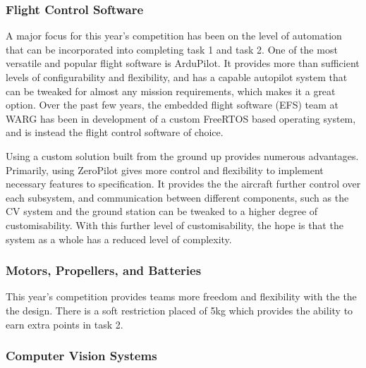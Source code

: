 
\subsubsection{Flight Control Software}

A major focus for this year's competition has been on the level of automation
that can be incorporated into completing task 1 and task 2. One of the most
versatile and popular flight software is ArduPilot. It provides more than
sufficient levels of configurability and flexibility, and has a capable
autopilot system that can be tweaked for almost any mission requirements, which
makes it a great option. Over the past few years, the embedded flight software
(EFS) team at WARG has been in development of a custom FreeRTOS based operating
system, and is instead the flight control software of choice.

Using a custom solution built from the ground up provides numerous advantages.
Primarily, using ZeroPilot gives more control and flexibility to implement
necessary features to specification. It provides the the aircraft further
control over each subsystem, and communication between different components,
such as the CV system and the ground station can be tweaked to a higher degree
of customisability. With this further level of customisability, the hope is
that the system as a whole has a reduced level of complexity.

\subsubsection{Motors, Propellers, and Batteries}

This year's competition provides teams more freedom and flexibility with the the
the design. There is a soft restriction placed of 5kg which provides the ability
to earn extra points in task 2.



\subsubsection{Computer Vision Systems}


